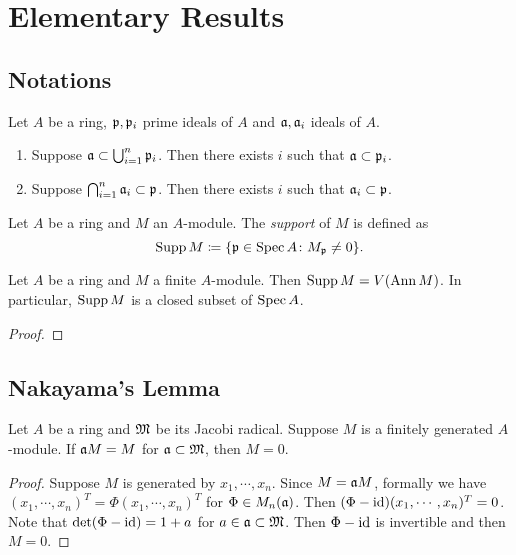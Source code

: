 \section{Elementary Results}

\subsection{Notations}

    \begin{proposition}\label{prop: prime avoidance lemma primity of prime ideals}
        Let $A$ be a ring, ${\mathfrak{p}},{\mathfrak{p}}_i$ prime ideals of $A$ and \({\mathfrak{a}},{\mathfrak{a}}_i\) ideals of $A$. 
        \begin{enumerate}
            \item Suppose \({\mathfrak{a}} \subset \bigcup_{i=1}^n {\mathfrak{p}}_i\). 
            Then there exists \(i\) such that \({\mathfrak{a}} \subset {\mathfrak{p}}_i\).
            \item Suppose \(\bigcap_{i=1}^n {\mathfrak{a}}_i \subset {\mathfrak{p}}\). 
            Then there exists \(i\) such that \({\mathfrak{a}}_i \subset {\mathfrak{p}}\).
        \end{enumerate}
    \end{proposition}

    \begin{definition}\label{def: support of a module}
        Let \(A\) be a ring and \(M\) an \(A\)-module.
        The \emph{support} of \(M\) is defined as
        \[
            \operatorname{Supp} M \coloneqq \{ {\mathfrak{p}} \in \operatorname{Spec} A \colon M_{\mathfrak{p}} \neq 0\}.
        \]
    \end{definition}

    \begin{proposition}\label{prop: support of a finite module}
        Let \(A\) be a ring and \(M\) a finite \(A\)-module.
        Then \(\operatorname{Supp} M = V(\operatorname{Ann} M)\).
        In particular, \(\operatorname{Supp} M\) is a closed subset of \(\operatorname{Spec} A\).
    \end{proposition}
    \begin{proof}
    \end{proof}

\subsection{Nakayama's Lemma}

    \begin{theorem}\label{thm: Nakayama's lemma}
        Let $A$ be a ring and ${\mathfrak{M}}$ be its Jacobi radical.
        Suppose $M$ is a finitely generated $A$-module.
        If ${\mathfrak{a}} M = M$ for ${\mathfrak{a}} \subset {\mathfrak{M}}$, then $M = 0$.
    \end{theorem}
    \begin{proof}
        Suppose $M$ is generated by $x_1,\cdots,x_n$.
        Since $M = {\mathfrak{a}} M$, formally we have $(x_1,\cdots,x_n)^T = \Phi (x_1,\cdots, x_n)^T$ for $\Phi \in M_n({\mathfrak{a}})$.
        Then $(\Phi - {\operatorname{id}}) (x_1,\cdots, x_n)^T = 0$. 
        Note that $\det (\Phi - {\operatorname{id}}) = 1+a$ for $a \in {\mathfrak{a}} \subset {\mathfrak{M}}$.
        Then $\Phi-{\operatorname{id}}$ is invertible and then $M=0$.
    \end{proof}

